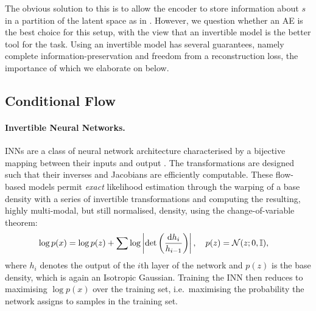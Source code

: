 The obvious solution to this is to allow the encoder to store information about $s$ in a partition
of the latent space as in  \citet{creager2019flexibly}. 
%
However, we question whether an \ac{AE} is the best choice for this setup, with the view that an
invertible model is the better tool for the task. 
%
Using an invertible model has several guarantees, namely complete information-preservation
and freedom from a reconstruction loss, the importance of which we elaborate on below.

\subsection{Conditional Flow}\label{cflow}
%
\paragraph{Invertible Neural Networks.}
INNs are a class of neural network architecture characterised by a bijective
mapping between their inputs and output \citep{Dinh2014}. 
%
The transformations are designed such that their inverses and Jacobians are efficiently computable.
%
These flow-based models permit \emph{exact} likelihood estimation \citep{normflows2015} through the
warping of a base density with a series of invertible transformations and computing the resulting,
highly multi-modal, but still normalised, density, using the change-of-variable theorem:
%
\begin{align}
\begin{split}
  \log p(x) &= \log p(z) + 
   \sum \log \left| \det\left( \frac{\diff h_i}{ h_{i-1}}\right) \right|, %
  \quad p(z) = \gN(z; 0, \sI),
  \label{eq:changeofvariables}
\end{split}
\end{align}
%
where $h_i$ denotes the output of the \(i\)th layer of the network and $p(z)$ is the base density,
which is again an Isotropic Gaussian. 
%
Training the INN then reduces to maximising $\log p(x)$ over the training set, i.e.\ maximising the
probability the network assigns to samples in the training set.


